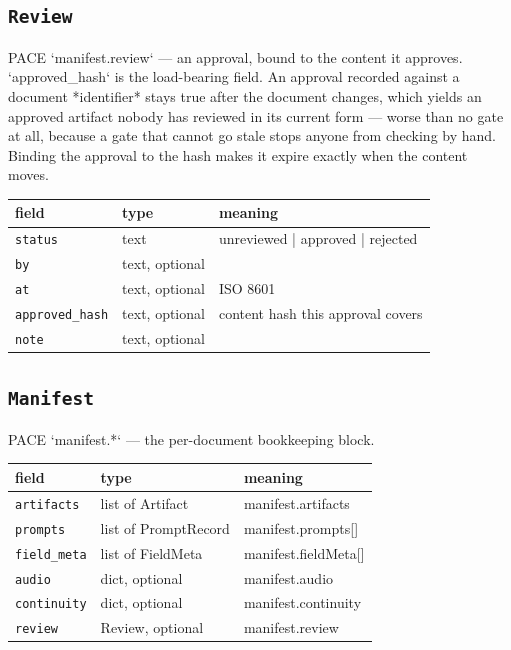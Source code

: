\subsection*{\texttt{Review}}
\noindent PACE `manifest.review` ---\allowbreak{} an approval, bound to the content it approves. `approved\_\allowbreak hash` is the load-bearing field. An approval recorded against a document *identifier* stays true after the document changes, which yields an approved artifact nobody has reviewed in its current form ---\allowbreak{} worse than no gate at all, because a gate that cannot go stale stops anyone from checking by hand. Binding the approval to the hash makes it expire exactly when the content moves.

\begin{longtable}{@{}R{0.24\textwidth}R{0.21\textwidth}R{0.49\textwidth}@{}}
\toprule \textbf{field} & \textbf{type} & \textbf{meaning} \\ \midrule
\endhead
\texttt{status} & text & unreviewed | approved | rejected \\
\texttt{by} & text, optional &  \\
\texttt{at} & text, optional & ISO 8601 \\
\texttt{approved\_\allowbreak hash} & text, optional & content hash this approval covers \\
\texttt{note} & text, optional &  \\
\bottomrule
\end{longtable}

\subsection*{\texttt{Manifest}}
\noindent PACE `manifest.*` ---\allowbreak{} the per-document bookkeeping block.

\begin{longtable}{@{}R{0.24\textwidth}R{0.21\textwidth}R{0.49\textwidth}@{}}
\toprule \textbf{field} & \textbf{type} & \textbf{meaning} \\ \midrule
\endhead
\texttt{artifacts} & list of Artifact & manifest.artifacts \\
\texttt{prompts} & list of PromptRecord & manifest.prompts[] \\
\texttt{field\_\allowbreak meta} & list of FieldMeta & manifest.fieldMeta[] \\
\texttt{audio} & dict, optional & manifest.audio \\
\texttt{continuity} & dict, optional & manifest.continuity \\
\texttt{review} & Review, optional & manifest.review \\
\bottomrule
\end{longtable}

